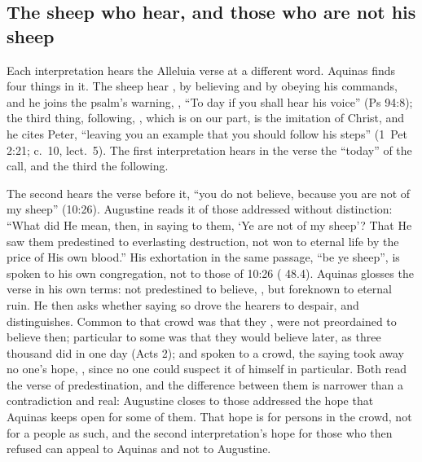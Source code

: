 \subsection{The sheep who hear, and those who are not his sheep}

Each interpretation hears the Alleluia verse at a different word. Aquinas
finds four things in it. The sheep hear , by believing and by obeying his commands, and he joins the psalm's
warning, , ``To day if you shall hear
his voice'' (Ps 94:8); the third thing,
following, , which is
on our part, is the imitation of Christ, and he cites Peter, ``leaving you an
example that you should follow his steps'' (1~Pet 2:21; 
c.~10, lect.~5). The first interpretation hears in the verse the ``today'' of
the call, and the third the following.

The second hears the verse before it, ``you do not believe, because you are
not of my sheep'' (10:26). Augustine reads it of those addressed without
distinction: ``What did He mean, then, in saying to them, `Ye are not of my
sheep'? That He saw them predestined to everlasting destruction, not won
to eternal life by the price of His own blood.'' His exhortation in the same
passage, ``be ye sheep'', is spoken to his own congregation, not to those of
10:26 ( 48.4). Aquinas glosses the verse in his own
terms: not predestined to believe, ,
but foreknown to eternal ruin. He then asks whether saying so drove the hearers
to despair, and distinguishes. Common to that crowd was that they , were not preordained to believe
then; particular to some was that they would believe later, as three thousand
did in one day (Acts 2); and spoken to a crowd, the saying took away no one's
hope, , since no one
could suspect it of himself in particular. Both read the verse of
predestination, and the difference between them is narrower than a
contradiction and real: Augustine closes to those addressed the hope that
Aquinas keeps open for some of them. That hope is for persons in the crowd, not
for a people as such, and the second interpretation's hope for those who then
refused can appeal to Aquinas and not to Augustine.

